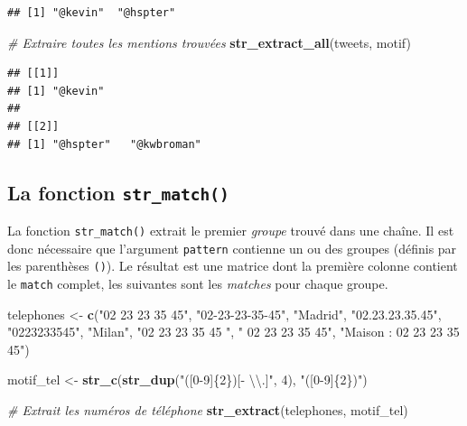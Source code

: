 \documentclass[
  11pt,
]{book}
\newenvironment{Shaded}{\begin{snugshade}}{\end{snugshade}}
\newcommand{\CharTok}[1]{\textcolor[rgb]{0.31,0.60,0.02}{#1}}
\newcommand{\CommentTok}[1]{\textcolor[rgb]{0.56,0.35,0.01}{\textit{#1}}}
\newcommand{\DecValTok}[1]{\textcolor[rgb]{0.00,0.00,0.81}{#1}}
\newcommand{\KeywordTok}[1]{\textcolor[rgb]{0.13,0.29,0.53}{\textbf{#1}}}
\newcommand{\NormalTok}[1]{#1}
\newcommand{\StringTok}[1]{\textcolor[rgb]{0.31,0.60,0.02}{#1}}
\numberwithin{equation}{section}
\numberwithin{countremarque}{section}
\begin{document}
\begin{lstlisting}
## [1] "@kevin"  "@hspter"
\end{lstlisting}

\begin{Shaded}
\begin{Highlighting}[]
\CommentTok{\# Extraire toutes les mentions trouvées}
\KeywordTok{str\_extract\_all}\NormalTok{(tweets, motif)}
\end{Highlighting}
\end{Shaded}

\begin{lstlisting}
## [[1]]
## [1] "@kevin"
## 
## [[2]]
## [1] "@hspter"   "@kwbroman"
\end{lstlisting}

\hypertarget{manip_regex_stringr_match}{%
\subsection{\texorpdfstring{La fonction \texttt{str\_match()}}{La fonction str\_match()}}\label{manip_regex_stringr_match}}

La fonction \texttt{str\_match()} extrait le premier \emph{groupe} trouvé dans une chaîne. Il est donc nécessaire que l'argument \texttt{pattern} contienne un ou des groupes (définis par les parenthèses \texttt{()}). Le résultat est une matrice dont la première colonne contient le \texttt{match} complet, les suivantes sont les \emph{matches} pour chaque groupe.

\begin{Shaded}
\begin{Highlighting}[]
\NormalTok{telephones \textless{}{-}}\StringTok{ }\KeywordTok{c}\NormalTok{(}\StringTok{"02 23 23 35 45"}\NormalTok{, }\StringTok{"02{-}23{-}23{-}35{-}45"}\NormalTok{, }\StringTok{"Madrid"}\NormalTok{,}
                \StringTok{"02.23.23.35.45"}\NormalTok{, }\StringTok{"0223233545"}\NormalTok{, }\StringTok{"Milan"}\NormalTok{,}
                \StringTok{"02 23 23 35 45  "}\NormalTok{, }\StringTok{" 02 23 23 35 45"}\NormalTok{,}
                \StringTok{"Maison : 02 23 23 35 45"}\NormalTok{)}

\NormalTok{motif\_tel \textless{}{-}}\StringTok{ }\KeywordTok{str\_c}\NormalTok{(}\KeywordTok{str\_dup}\NormalTok{(}\StringTok{"([0{-}9]\{2\})[{-} }\CharTok{\textbackslash{}\textbackslash{}}\StringTok{.]"}\NormalTok{, }\DecValTok{4}\NormalTok{),  }\StringTok{"([0{-}9]\{2\})"}\NormalTok{)}

\CommentTok{\# Extrait les numéros de téléphone}
\KeywordTok{str\_extract}\NormalTok{(telephones, motif\_tel)}
\end{Highlighting}
\end{Shaded}
\end{document}
